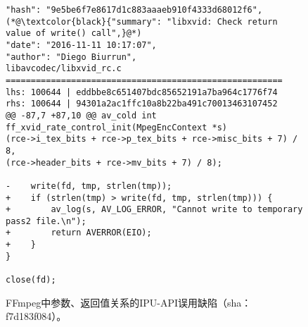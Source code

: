 \begin{figure}[t]
	\centering
\begin{lstlisting}
"hash": "9e5be6f7e8617d1c883aaaeb910f4333d68012f6",
(*@\textcolor{black}{"summary": "libxvid: Check return value of write() call",}@*)
"date": "2016-11-11 10:17:07",
"author": "Diego Biurrun",
libavcodec/libxvid_rc.c
=======================================================
lhs: 100644 | eddbbe8c651407bdc85652191a7ba964c1776f74
rhs: 100644 | 94301a2ac1ffc10a8b22ba491c70013463107452
@@ -87,7 +87,10 @@ av_cold int ff_xvid_rate_control_init(MpegEncContext *s)
(rce->i_tex_bits + rce->p_tex_bits + rce->misc_bits + 7) / 8,
(rce->header_bits + rce->mv_bits + 7) / 8);

-    write(fd, tmp, strlen(tmp));
+    if (strlen(tmp) > write(fd, tmp, strlen(tmp))) {
+        av_log(s, AV_LOG_ERROR, "Cannot write to temporary pass2 file.\n");
+        return AVERROR(EIO);
+    }
}

close(fd);

\end{lstlisting}
	\caption{
	FFmpeg中参数、返回值关系的IPU-API误用缺陷（sha：f7d183f084）。
	}
	\label{fig:2-3-ipu-2}
\end{figure}